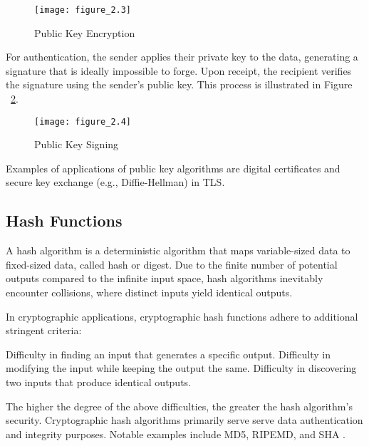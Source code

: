 \begin{figure}[h!]
\centering
\texttt{[image: figure\_2.3]}\\
\caption{Public Key Encryption}
\label{fig:figure2.3}
\end{figure}

For authentication, the sender applies their private key to the data, generating a signature that is ideally impossible to forge.  Upon receipt, the recipient verifies the signature using the sender's public key. This process is illustrated in Figure ~\ref{fig:figure2.4}.


\begin{figure}
\centering
\texttt{[image: figure\_2.4]}\\
\caption{Public Key Signing}
\label{fig:figure2.4}
\end{figure}

Examples of applications of public key algorithms are digital certificates and secure key exchange (e.g., Diffie-Hellman) in TLS.



\subsection{Hash Functions}
A hash algorithm is a deterministic algorithm that maps variable-sized data to fixed-sized data, called hash or digest. Due to the finite number of potential outputs compared to the infinite input space, hash algorithms inevitably encounter collisions, where distinct inputs yield identical outputs.



In cryptographic applications, cryptographic hash functions adhere to additional stringent criteria:
\begin{outline}
\1 Difficulty in finding an input that generates a specific output.
\1 Difficulty in modifying the input while keeping the output the same.
\1 Difficulty in discovering two inputs that produce identical outputs.
\end{outline}

The higher the degree of the above difficulties, the greater the hash algorithm's security. Cryptographic hash algorithms primarily serve serve data authentication and integrity purposes. Notable examples include MD5, RIPEMD, and SHA \cite{fips_118_2}.


